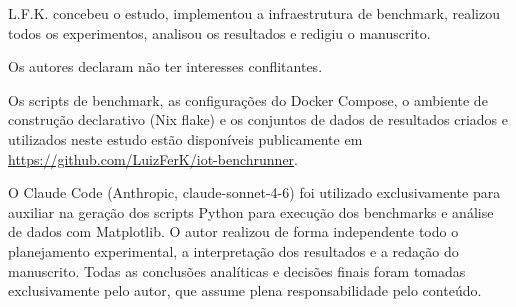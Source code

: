 \documentclass[brazilian]{presets/sbcreviews-2025}%
\begin{document}
\begin{declarations}

  \begin{contributions}
    L.F.K. concebeu o estudo, implementou a infraestrutura de benchmark, realizou todos os experimentos,
    analisou os resultados e redigiu o manuscrito.
  \end{contributions}

  \begin{interests}
    Os autores declaram não ter interesses conflitantes.
  \end{interests}

  \begin{materials}
    Os scripts de benchmark, as configurações do Docker Compose, o ambiente de construção declarativo
    (Nix flake) e os conjuntos de dados de resultados criados e utilizados neste estudo estão disponíveis publicamente em
    \url{https://github.com/LuizFerK/iot-benchrunner}.
  \end{materials}

  \begin{aitools}
    O Claude Code (Anthropic, claude-sonnet-4-6) foi utilizado exclusivamente para auxiliar na geração dos scripts Python para execução dos benchmarks e análise de dados com Matplotlib. O autor realizou de forma independente todo o planejamento experimental, a interpretação dos resultados e a redação do manuscrito. Todas as conclusões analíticas e decisões finais foram tomadas exclusivamente pelo autor, que assume plena responsabilidade pelo conteúdo.
  \end{aitools}

\end{declarations}



\end{document}
